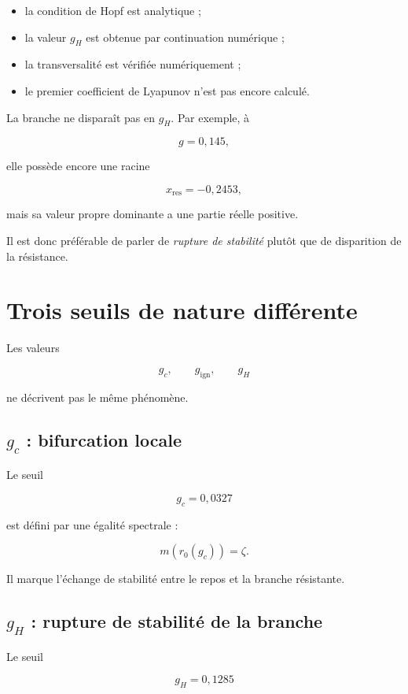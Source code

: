\begin{itemize}
\item
  la condition de Hopf est analytique ;
\item
  la valeur \(g_H\) est obtenue par continuation numérique ;
\item
  la transversalité est vérifiée numériquement ;
\item
  le premier coefficient de Lyapunov n'est pas encore calculé.
\end{itemize}

La branche ne disparaît pas en \(g_H\). Par exemple, à

\[
g=0{,}145,
\]

elle possède encore une racine

\[
x_{\mathrm{res}}
=
-0{,}2453,
\]

mais sa valeur propre dominante a une partie réelle positive.

Il est donc préférable de parler de \emph{rupture de stabilité} plutôt
que de disparition de la résistance.

\section{Trois seuils de nature différente}
\label{annexe-resistance-trois-seuils}

Les valeurs

\[
g_c,
\qquad
g_{\mathrm{ign}},
\qquad
g_H
\]

ne décrivent pas le même phénomène.

\subsection{\texorpdfstring{$g_c$}{gc} : bifurcation locale}

Le seuil

\[
g_c
=
0{,}0327
\]

est défini par une égalité spectrale :

\[
m(r_0(g_c))=\zeta.
\]

Il marque l'échange de stabilité entre le repos et la branche
résistante.

\subsection{\texorpdfstring{$g_H$}{gH} : rupture de stabilité de la branche}

Le seuil

\[
g_H
=
0{,}1285
\]

